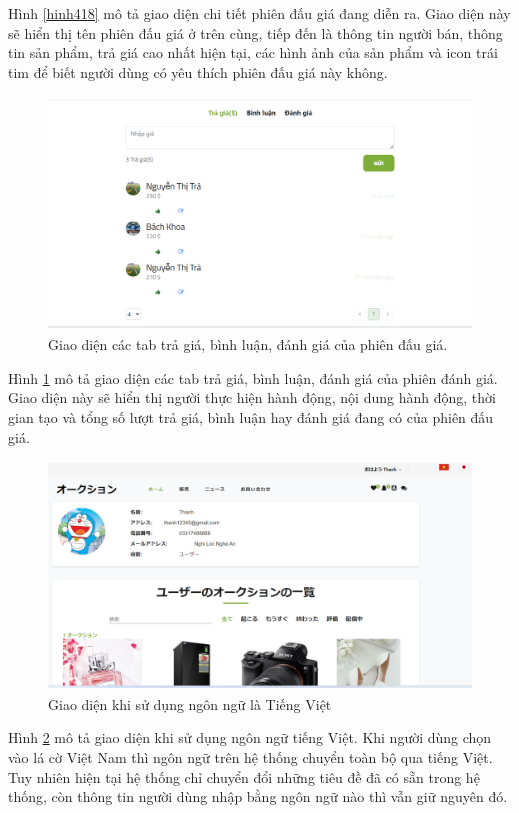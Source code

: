 \documentclass{article}
\begin{document}
Hình \ref{hinh418} mô tả giao diện chi tiết phiên đấu giá đang diễn ra. Giao diện này sẽ hiển thị tên phiên đấu giá ở trên cùng, tiếp đến là thông tin người bán, thông tin sản phẩm, trả giá cao nhất hiện tại, các hình ảnh của sản phẩm và icon trái tim để biết người dùng có yêu thích phiên đấu giá này không.
\begin{figure}[H]
    \centering
    \includegraphics[width=11.4cm,height=6.20cm]{images/commentbid.png}
    \caption{Giao diện các tab trả giá, bình luận, đánh giá của phiên đấu giá.}
    \label{hinh419}
\end{figure}
Hình \ref{hinh419} mô tả giao diện các tab trả giá, bình luận, đánh giá của phiên đánh giá. Giao diện này sẽ hiển thị người thực hiện hành động, nội dung hành động, thời gian tạo và tổng số lượt trả giá, bình luận hay đánh giá đang có của phiên đấu giá. 
\begin{figure}[H]
    \centering
    \includegraphics[width=11.4cm,height=6.06cm]{images/jp.png}
    \caption{Giao diện khi sử dụng ngôn ngữ là Tiếng Việt}
    \label{hinh420}
\end{figure}
Hình \ref{hinh420} mô tả giao diện khi sử dụng ngôn ngữ tiếng Việt. Khi người dùng chọn vào lá cờ Việt Nam thì ngôn ngữ trên hệ thống chuyển toàn bộ qua tiếng Việt. Tuy nhiên hiện tại hệ thống chỉ chuyển đổi những tiêu đề đã có sẵn trong hệ thống, còn thông tin người dùng nhập bằng ngôn ngữ nào thì vẫn giữ nguyên đó.
\end{document}
